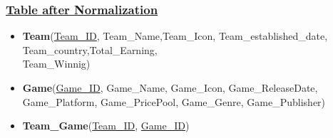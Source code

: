 \subsubsection*{\underline{Table after Normalization}}
\begin{itemize}
    \item \textbf{Team}(\underline{Team\_ID}, Team\_Name,Team\_Icon, Team\_established\_date, Team\_country,Total\_Earning,\\Team\_Winnig)
    \item \textbf{Game}(\underline{Game\_ID}, Game\_Name, Game\_Icon, Game\_ReleaseDate, Game\_Platform, Game\_PricePool, Game\_Genre, Game\_Publisher)
    \item \textbf{Team\_Game}(\underline{Team\_ID}, \underline{Game\_ID})
\end{itemize}
\clearpage